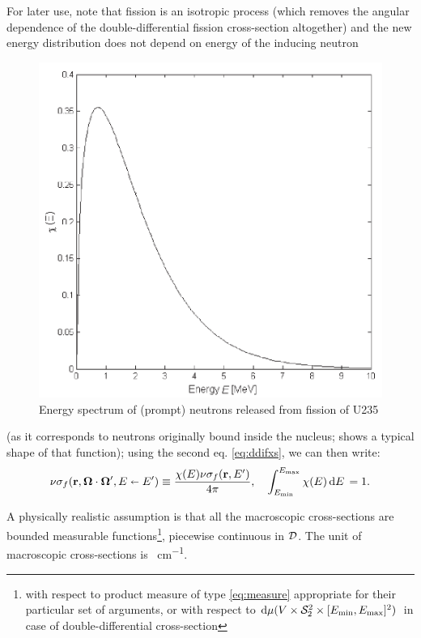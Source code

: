 For later use, note that fission is an isotropic process (which removes the angular dependence of the
double-differential fission cross-section altogether) and the new energy distribution does not depend on energy of 
the inducing neutron 
\begin{figure}[hbt]
\begin{center}
  \includegraphics[scale=.6]{spectrum}
  \caption{Energy spectrum of (prompt) neutrons released from fission of U235}
  \label{fig:spectrum}
\end{center}
\end{figure}
(as it corresponds to neutrons originally bound inside the nucleus; 
shows a typical shape of that function); using the second eq.
\eqref{eq:ddifxs}, we can then write:
\begin{equation}\label{eq:sf}
\nu\sigma_f(\mathbf{r},\mathbf{\Omega}\cdot\mathbf{\Omega}',E\shortleftarrow E') \equiv \frac{\chi(E)\nu\sigma_f(\mathbf{r},E')}{4\pi},\quad 
\int_{E_{\text{min}}}^{E_{\text{max}}}\chi(E)\,\text{d}E\, = 1.
\end{equation}
 
A physically realistic assumption is that all the macroscopic cross-sections are bounded measurable functions\footnote{
with respect to product measure of type \eqref{eq:measure} appropriate for their particular set of arguments, or with  
respect to $\text{d}\mu(V\times\mathcal{S}_2^2\times [E_{\text{min}},E_{\text{max}}]^2)\,$ in case of double-differential cross-section}, piecewise 
continuous in $\mathcal{D}$. The unit of macroscopic cross-sections is \SI{}{cm^{-1}}.


